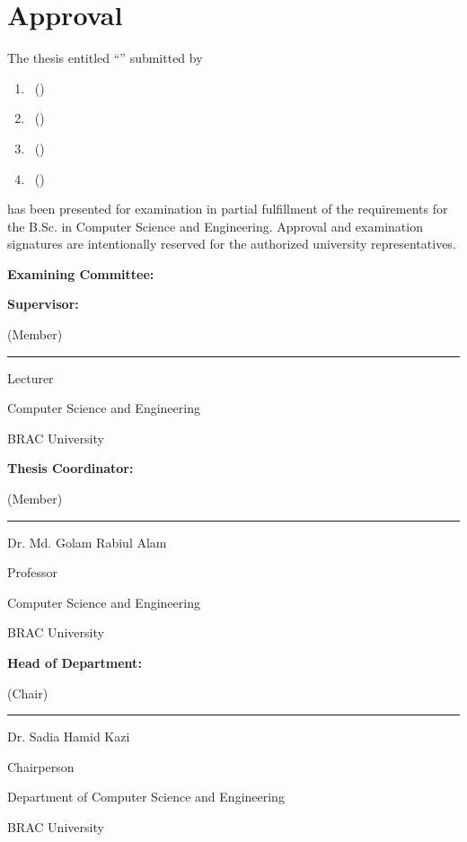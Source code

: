 \chapter*{Approval}
The thesis entitled ``\FullThesisTitle'' submitted by
\begin{enumerate}[itemsep=2pt,topsep=6pt,parsep=0pt]
\item \StudentOne\ (\StudentOneID)
\item \StudentTwo\ (\StudentTwoID)
\item \StudentThree\ (\StudentThreeID)
\item \StudentFour\ (\StudentFourID)
\end{enumerate}
\noindent has been presented for examination in partial fulfillment of the requirements for the B.Sc. in Computer Science and Engineering. Approval and examination signatures are intentionally reserved for the authorized university representatives.
\par\vspace{0.35cm}
\noindent\textbf{Examining Committee:}\par\vspace{0.35cm}
\newcommand{\CommitteePerson}[5]{%
\noindent\begin{minipage}[t]{0.30\linewidth}
\raggedright\textbf{#1}\par #2
\end{minipage}\hfill%
\begin{minipage}[t]{0.66\linewidth}\centering
  \vspace*{0.56cm}\rule{5.4cm}{0.4pt}\par\vspace{0.11cm}
  #3\par\vspace{0.12cm}
  #4\par
  #5\par
  BRAC University\par
\end{minipage}\par\vspace{0.48cm}
}
\CommitteePerson{Supervisor:}{(Member)}{\PrimarySupervisor}{Lecturer}{Computer Science and Engineering}
\CommitteePerson{Thesis Coordinator:}{(Member)}{Dr. Md. Golam Rabiul Alam}{Professor}{Computer Science and Engineering}
\CommitteePerson{Head of Department:}{(Chair)}{Dr. Sadia Hamid Kazi}{Chairperson}{Department of Computer Science and Engineering}
